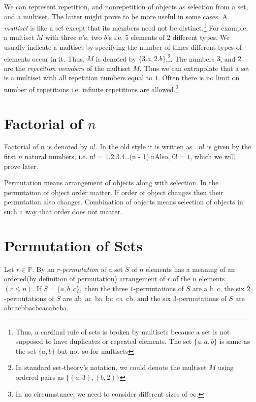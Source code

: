 We can represent repetition, and nonrepetition of objects as selection from a set, and a multiset. The latter might prove to be more
useful in some cases. A {\it multiset} is like a set except that its members need not be distinct.\footnote{Thus, a cardinal
rule of sets is broken by multisets because a set is not supposed to have duplicates or repeated elements. The set $\{a, a, b\}$ is
same as the set $\{a, b\}$ but not so for multisets} For example, a multiset $M$ with three $a$'s, two $b$'s i.e. $5$ elements of
$2$ different types. We usually indicate a multiset by specifying the number of times different types of elements occur in
it. Thus, $M$ is denoted by $\{3.a,2.b\}$.\footnote{In standard set-theory's notation, we could denote the multiset $M$ using
ordered pairs as $\{(a, 3), (b, 2)\}$}. The numbers $3$, and $2$ are the {\it repetition members} of the multiset $M$. Thus we
can extrapolate that a set is a multiset with all repetition numbers equal to $1$. Often there is no limit on number of repetitions
i.e. infinite repetitions are allowed.\footnote{In no circumstance, we need to consider different sizes of $\infty$.}

\section{Factorial of $n$}
Factorial of $n$ is denoted by $n!$. In the old style it is written as . $n!$ is given by the first $n$ natural
numbers, i.e. \startformula n! = 1.2.3.4\ldots(n - 1).n\stopformula Also, $0! = 1$, which we will prove later.

Permutation means arrangement of objects along with selection. In the permutation of object order matter. If order of object
changes then their permutation also changes. Combination of objects means selection of objects in such a way that order does not
matter.

\section{Permutation of Sets}
Let $r\in \mathbb{P}$. By an $r$-{\it permutation} of a set $S$ of $n$ elements has a meaning of an ordered(by definition of
permutation) arrangement of $r$ of the $n$ elements$(r\leq n)$. If $S = \{a, b, c\},$ then the three $1$-permutations of $S$ are
\startformula a\,\m\,b\,\,\,c,\stopformula
the six $2$-permutations of $S$ are
\startformula ab\,\,\,ac\,\,\,ba\,\,\,bc\,\,\,ca\,\,\,cb,\stopformula
and the six $3$-permutations of $S$ are
\startformula abc\;\;acb\;\;bac\;\;bca\;\;cab\;\;cba.\stopformula

